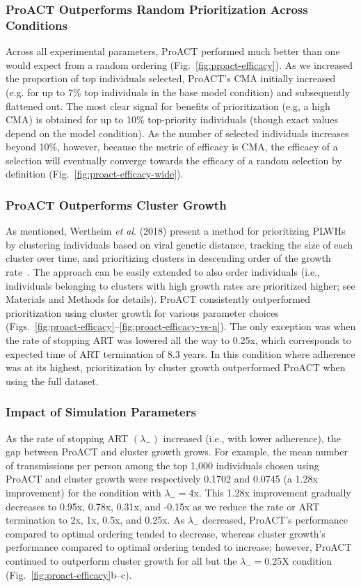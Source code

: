 \subsubsection{ProACT Outperforms Random Prioritization Across Conditions}
Across all experimental parameters, ProACT performed much better than one would expect from a random ordering (Fig.~\ref{fig:proact-efficacy}). As we increased the proportion of top individuals selected, ProACT's \gls{CMA} initially increased (e.g. for up to 7\% top individuals in the base model condition) and subsequently flattened out. The most clear signal for benefits of prioritization (e.g, a high \gls{CMA}) is obtained for up to 10\% top-priority individuals (though exact values depend on the model condition).  As the number of selected individuals increases beyond 10\%, however, because the metric of efficacy is \gls{CMA}, the efficacy of a selection will eventually converge towards the efficacy of a random selection by definition (Fig.~\ref{fig:proact-efficacy-wide}).

\subsubsection{ProACT Outperforms Cluster Growth}
As mentioned, Wertheim \textit{et al}. (2018) present a method for prioritizing \glspl{PLWH} by clustering individuals based on viral genetic distance, tracking the size of each cluster over time, and prioritizing clusters in descending order of the growth rate~\cite{Wertheim2018}. The approach can be easily extended to also order individuals (i.e., individuals belonging to clusters with high growth rates are prioritized higher; see Materials and Methods for details). ProACT consistently outperformed prioritization using cluster growth for various parameter choices (Figs.~\ref{fig:proact-efficacy}--\ref{fig:proact-efficacy-vs-n}). The only exception was when the rate of stopping \gls{ART} was lowered all the way to 0.25x, which corresponds to expected time of \gls{ART} termination of 8.3 years. In this condition where adherence was at its highest, prioritization by cluster growth outperformed ProACT when using the full dataset.

\subsubsection{Impact of Simulation Parameters}
As the rate of stopping \gls{ART} $\left(\lambda_{-}\right)$ increased (i.e., with lower adherence), the gap between ProACT and cluster growth grows.
For example, the mean number of transmissions per person among the top 1,000 individuals chosen using ProACT and cluster growth were respectively 0.1702 and 0.0745 (a 1.28x improvement) for the condition with $\lambda_-=4$x. 
This 1.28x improvement gradually decreases to  0.95x, 0.78x, 0.31x, and -0.15x as we reduce the rate or ART termination to 2x, 1x, 0.5x, and 0.25x.
As  $\lambda_{-}$ decreased, ProACT's performance compared to optimal ordering tended to decrease, whereas cluster growth's performance compared to optimal ordering tended to increase; however, ProACT continued to outperform cluster growth for all but the $\lambda_-=$0.25X condition (Fig.~\ref{fig:proact-efficacy}b--c).

